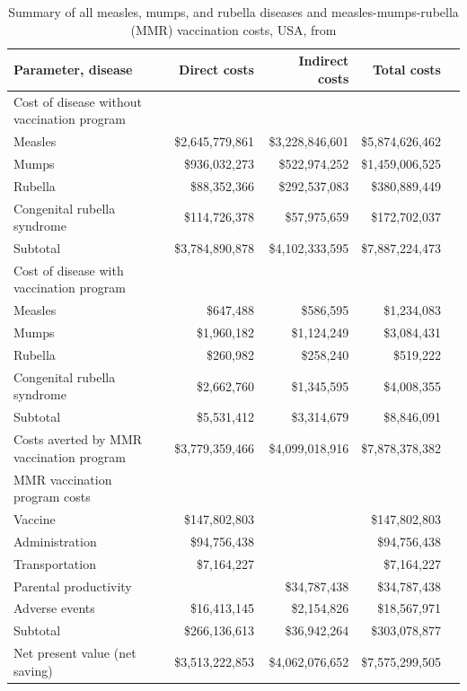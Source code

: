 \documentclass{article}
\begin{document}
\begin{table}\small
\begin{center}
\begin{tabular}{lrrrr}
\hline
Parameter, disease & Direct costs & Indirect costs & Total costs\\
\hline
Cost of disease without vaccination program \\
\hline
Measles & \$2,645,779,861 & \$3,228,846,601 & \$5,874,626,462 \\
Mumps & \$936,032,273 & \$522,974,252 & \$1,459,006,525 \\
Rubella & \$88,352,366 & \$292,537,083 & \$380,889,449 \\
Congenital rubella syndrome & \$114,726,378 & \$57,975,659 & \$172,702,037 \\
Subtotal & \$3,784,890,878 & \$4,102,333,595 & \$7,887,224,473 \\
\hline
Cost of disease with vaccination program \\
\hline
Measles & \$647,488 & \$586,595 & \$1,234,083 \\
Mumps & \$1,960,182  & \$1,124,249  & \$3,084,431 \\
Rubella  & \$260,982  & \$258,240  & \$519,222 \\
Congenital rubella syndrome  & \$2,662,760  & \$1,345,595  & \$4,008,355 \\
Subtotal  & \$5,531,412  & \$3,314,679  & \$8,846,091 \\
Costs averted by MMR vaccination program & \$3,779,359,466 & \$4,099,018,916 & \$7,878,378,382 \\
\hline
MMR vaccination program costs \\
\hline
Vaccine & \$147,802,803 &  & \$147,802,803 \\
Administration  & \$94,756,438 & & \$94,756,438 \\
Transportation  & \$7,164,227 &  & \$7,164,227 \\
Parental productivity &   & \$34,787,438 & \$34,787,438 \\
Adverse events  & \$16,413,145  & \$2,154,826  & \$18,567,971 \\
Subtotal  & \$266,136,613  & \$36,942,264  & \$303,078,877 \\
Net present value (net saving)  & \$3,513,222,853  & \$4,062,076,652  & \$7,575,299,505 \\
\hline
\end{tabular}
\end{center}
\caption{Summary of all measles, mumps, and rubella diseases and measles-mumps-rubella (MMR) vaccination costs, USA, from \citep{zhou4}}
\label{table:zhou}
\end{table}%
\end{document}
